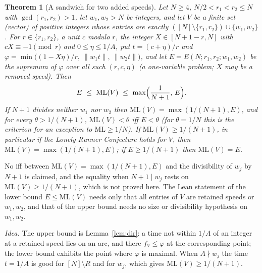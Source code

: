 \documentclass[11pt]{article}
\newtheorem{theorem}{Theorem}[section]
\theoremstyle{definition}
\theoremstyle{remark}
\newcommand{\nd}[1]{\lVert #1\rVert}
\newcommand{\ML}{\mathrm{ML}}
\begin{document}
\begin{theorem}[A sandwich for two added speeds]\label{thm:E}
Let $N\ge4$, $N/2<r_1<r_2\le N$ with $\gcd(r_1,r_2)>1$, let $w_1,w_2>N$ be integers, and let $V$ be a finite set (vector) of positive integers whose entries are exactly $([N]\setminus\{r_1,r_2\})\cup\{w_1,w_2\}$. For $r\in\{r_1,r_2\}$, a unit $c$ modulo $r$, the integer $X\in[N+1-r,N]$ with $cX\equiv-1\pmod r$ and $0\le\eta\le1/A$, put $t=(c+\eta)/r$ and $\varphi=\min\bigl((1-X\eta)/r,\ \nd{w_1t},\ \nd{w_2t}\bigr)$, and let $E=E(N;r_1,r_2;w_1,w_2)$ be the supremum of $\varphi$ over all such $(r,c,\eta)$ (a one-variable problem; $X$ may be a removed speed). Then
\[
E\ \le\ \ML(V)\ \le\ \max\Bigl(\frac1{N+1},\,E\Bigr).
\]
If $N+1$ divides neither $w_1$ nor $w_2$ then $\ML(V)=\max(1/(N+1),E)$, and for every $\theta>1/(N+1)$, $\ML(V)<\theta$ iff $E<\theta$ (for $\theta=1/N$ this is the criterion for an exception to $\ML\ge1/N$). If $\ML(V)\ge1/(N+1)$, in particular if the Lonely Runner Conjecture holds for $V$, then $\ML(V)=\max(1/(N+1),E)$; if $E\ge1/(N+1)$ then $\ML(V)=E$.
\end{theorem}
No iff between $\ML(V)=\max(1/(N+1),E)$ and the divisibility of $w_j$ by $N+1$ is claimed, and the equality when $N+1\mid w_j$ rests on $\ML(V)\ge1/(N+1)$, which is not proved here. The Lean statement of the lower bound $E\le\ML(V)$ needs only that all entries of $V$ are retained speeds or $w_1,w_2$, and that of the upper bound needs no size or divisibility hypothesis on $w_1,w_2$.

\emph{Idea.} The upper bound is Lemma~\ref{lem:dir}: a time not within $1/A$ of an integer at a retained speed lies on an arc, and there $f_V\le\varphi$ at the corresponding point; the lower bound exhibits the point where $\varphi$ is maximal. When $A\nmid w_j$ the time $t=1/A$ is good for $[N]\setminus R$ and for $w_j$, which gives $\ML(V)\ge1/(N+1)$.
\end{document}
